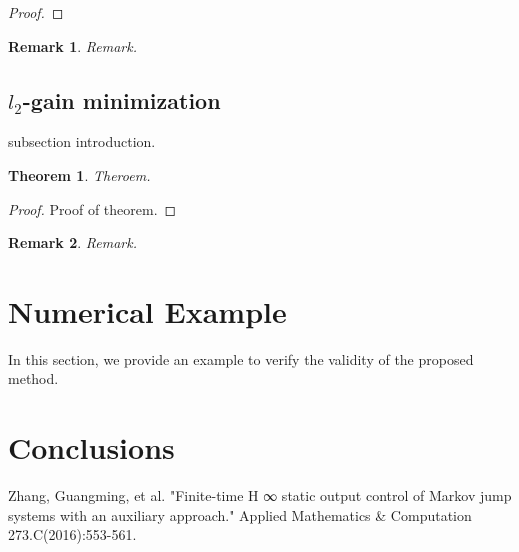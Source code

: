 \documentclass[conference]{IEEEtran}
\newtheorem{remark}{Remark}
\newtheorem{theorem}{Theorem}
\begin{document}
\begin{proof}
	
	
	
	
	
\end{proof}


\begin{remark}
	Remark.
\end{remark}


\subsection{$l_2$-gain minimization}\label{minimization} 
	subsection introduction.

\begin{theorem}\label{theorem2}	
	Theroem.
\end{theorem}

\begin{proof} 
	Proof of theorem.
\end{proof}

\begin{remark}
	Remark.
\end{remark}

\section{Numerical Example} \label{example}
In this section, we provide an example to verify the validity of the proposed method.





\section{Conclusions} \label{conclusion}




%
%


\begin{thebibliography}{1}
	
	Zhang, Guangming, et al. "Finite-time H ∞ static output control of Markov jump systems with an auxiliary approach." Applied Mathematics \& Computation 273.C(2016):553-561.
	
\end{thebibliography}




\end{document}
